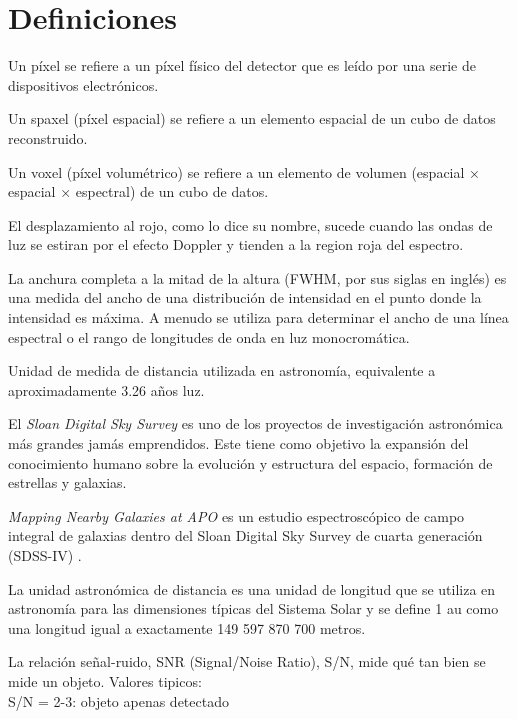 \documentclass[9pt,twocolumn,a4paper]{opticajnl}
\begin{document}
\newpage

\section*{Definiciones}
\begin{description}[style=nextline]
  \item[pixel] Un píxel se refiere a un píxel físico del detector que es leído por una serie de dispositivos electrónicos.
  \item[spaxel] Un spaxel (píxel espacial) se refiere a un elemento espacial de un cubo de datos reconstruido.
  \item[voxel] Un voxel (píxel volumétrico) se refiere a un elemento de volumen (espacial × espacial × espectral) de un cubo de datos. 
  \item[redshift] El desplazamiento al rojo, como lo dice su nombre, sucede cuando las ondas de luz se estiran por el efecto Doppler y tienden a la region roja del espectro.
  \item[FWHM]La anchura completa a la mitad de la altura (FWHM, por sus siglas en inglés) es una medida del ancho de una distribución de intensidad en el punto donde la intensidad es máxima. A menudo se utiliza para determinar el ancho de una línea espectral o el rango de longitudes de onda en luz monocromática. 
  \item[pársec] Unidad de medida de distancia utilizada en astronomía, equivalente a aproximadamente 3.26 años luz.
  \item[SDSS] El \textit{Sloan Digital Sky Survey} es uno de los proyectos de investigación astronómica más grandes jamás emprendidos. Este tiene como objetivo la expansión del conocimiento humano sobre la evolución y estructura del espacio, formación de estrellas y galaxias.
  \item[MaNGA] \textit{Mapping Nearby Galaxies at APO} es un estudio espectroscópico de campo integral de galaxias dentro del Sloan Digital Sky Survey de cuarta generación (SDSS-IV) \cite{weijmans2015manga}.
  \item[Unidad Astronomica / au] La unidad astronómica de distancia es una unidad de longitud que se utiliza en astronomía para las dimensiones típicas del Sistema Solar y se define 1 au como una longitud igual a exactamente 149 597 870 700 metros.
  \item[S/N] La relación señal-ruido, SNR (Signal/Noise Ratio), S/N, mide qué tan bien se mide un objeto. Valores tipicos:\\
  S/N = 2-3: objeto apenas detectado\\

\end{description}
\end{document}
